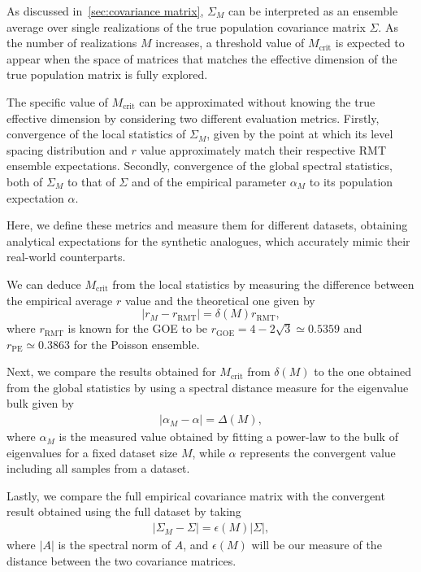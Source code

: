 \documentclass{article}
\begin{document}
As discussed in~\cref{sec:covariance matrix}, $\Sigma_M$ can be interpreted as an ensemble average over single realizations of the true population covariance matrix $\Sigma$. As the number of realizations $M$ increases, a threshold value of $M_\mathrm{crit}$ is expected to appear when the space of matrices that matches the effective dimension of the true population matrix is fully explored.

The specific value of $M_\mathrm{crit}$ can be approximated without knowing the true effective dimension by considering two different evaluation metrics. Firstly, convergence of the local statistics of $\Sigma_M$, given by the point at which its level spacing distribution and $r$ value approximately match their respective RMT ensemble expectations.
Secondly, convergence of the global spectral statistics, both of $\Sigma_M$ to that of $\Sigma$ and of the empirical parameter $\alpha_M$ to its population expectation $\alpha$.

Here, we define these metrics and measure them for different datasets, obtaining analytical expectations for the synthetic analogues, which accurately mimic their real-world counterparts.

We can deduce $M_\mathrm{crit}$ from the local statistics by measuring the difference between the empirical average $r$ value and the theoretical one given by
\begin{equation}
\label{eq:r_scaling}
|r_M - r_\mathrm{RMT} | = \delta(M) r_\mathrm{RMT},
\end{equation}
where $r_\mathrm{RMT}$ is known for the GOE to be $r_\mathrm{GOE} = 4-2\sqrt{3} \simeq 0.5359$ and $r_\mathrm{PE} \simeq 0.3863$ for the Poisson ensemble.

Next, we compare the results obtained for $M_\mathrm{crit}$ from $\delta(M)$ to the one obtained from the global statistics by using a spectral distance measure for the eigenvalue bulk given by
\begin{align}
\label{eq:alpha_scaling}
| \alpha_M - \alpha |
= \Delta(M),
\end{align}
where $\alpha_M$ is the measured value obtained by fitting a power-law to the bulk of eigenvalues for a fixed dataset size $M$, while $\alpha$ represents the convergent value including all samples from a dataset.

Lastly, we compare the full empirical covariance matrix with the convergent result obtained using the full dataset by taking
\begin{align}
\label{eq:sigma_scaling}
{| \Sigma_M - \Sigma |}
= \epsilon(M) | \Sigma |,
\end{align}
where $|A|$ is the spectral norm of $A$, and $\epsilon(M)$ will be our measure of the distance between the two covariance matrices.
\end{document}
